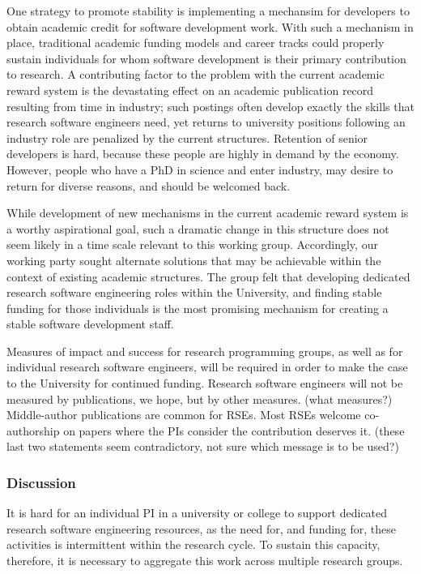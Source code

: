 One strategy to promote stability is implementing a mechansim for developers to obtain academic
credit for software development work. With such a mechanism in place, traditional academic funding
models and career tracks could properly sustain individuals for whom software development is their
primary contribution to research. A contributing factor to the problem with the current academic reward system is the
devastating effect on an academic
publication record resulting from time in industry; such postings often develop exactly the skills that research software
engineers need, yet returns to university positions following an industry role are penalized by the current structures.
Retention of senior developers is hard, because these people are highly in demand by the economy. However, people who have a
PhD in science and enter industry, may desire to return for diverse reasons, and should be welcomed back.

While development of new mechanisms in the current academic reward system is a worthy aspirational goal, such a dramatic
change in this structure does not seem likely in a time scale relevant to this working group. Accordingly, our working party
sought alternate solutions that may be achievable within the context of existing academic structures. The group felt that
developing dedicated research software engineering roles within the University, and finding stable funding for those individuals is the most promising mechanism for creating a stable software development staff.

Measures of impact and success for research programming groups, as well as for individual research software engineers, will
be required in order to make the case to the University for continued funding. Research software engineers will not be measured by publications, we hope, but by other measures. (what measures?) Middle-author publications are common for RSEs. Most RSEs welcome co-authorship on papers where the PIs consider the contribution deserves it.
(these last two statements seem contradictory, not sure which message is to be used?)

\subsubsection{Discussion}

It is hard for an individual PI in a university or college to support dedicated research software engineering resources, as
the need for, and funding for, these activities is intermittent within the research cycle. To sustain this capacity, therefore, it is necessary to aggregate this work across multiple research groups.

